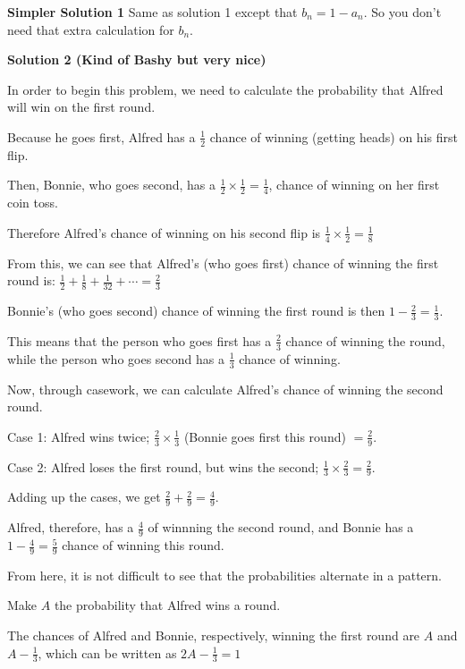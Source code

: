 \begin{enumerate}
 \textbf{Simpler Solution 1} Same as solution 1 except that $b_n=1-a_n$. So you don't need that extra calculation for $b_n$.

 



\textbf{Solution 2 (Kind of Bashy but very nice)}

In order to begin this problem, we need to calculate the probability that Alfred will win on the first round.

 Because he goes first, Alfred has a $\frac{1}{2}$ chance of winning (getting heads) on his first flip.

 Then, Bonnie, who goes second, has a $\frac{1}{2} \times \frac{1}{2} = \frac{1}{4}$, chance of winning on her first coin toss. 

 Therefore Alfred’s chance of winning on his second flip is $\frac{1}{4} \times \frac{1}{2} = \frac{1}{8}$

 


 From this, we can see that Alfred’s (who goes first) chance of winning the first round is: $\frac{1}{2} + \frac{1}{8} + \frac{1}{32} + \cdots = \frac{2}{3}$

 Bonnie’s (who goes second) chance of winning the first round is then $1 - \frac{2}{3} = \frac{1}{3}$.

 This means that the person who goes first has a $\frac{2}{3}$ chance of winning the round, while the person who goes second has a $\frac{1}{3}$ chance of winning.

 


 Now, through casework, we can calculate Alfred’s chance of winning the second round.

 Case 1: Alfred wins twice; $\frac{2}{3} \times \frac{1}{3}$ (Bonnie goes first this round) $=\frac{2}{9}$.

 Case 2: Alfred loses the first round, but wins the second; $\frac{1}{3} \times \frac{2}{3} = \frac{2}{9}$.

 Adding up the cases, we get $\frac{2}{9} + \frac{2}{9} = \frac{4}{9}$.

 Alfred, therefore, has a $\frac{4}{9}$ of winnning the second round, and Bonnie has a $1-\frac{4}{9} = \frac{5}{9}$ chance of winning this round.

 


 From here, it is not difficult to see that the probabilities alternate in a pattern.

 Make $A$ the probability that Alfred wins a round.

 The chances of Alfred and Bonnie, respectively, winning the first round are $A$ and $A - \frac{1}{3}$, which can be written as $2A - \frac{1}{3} = 1$


\end{enumerate}
